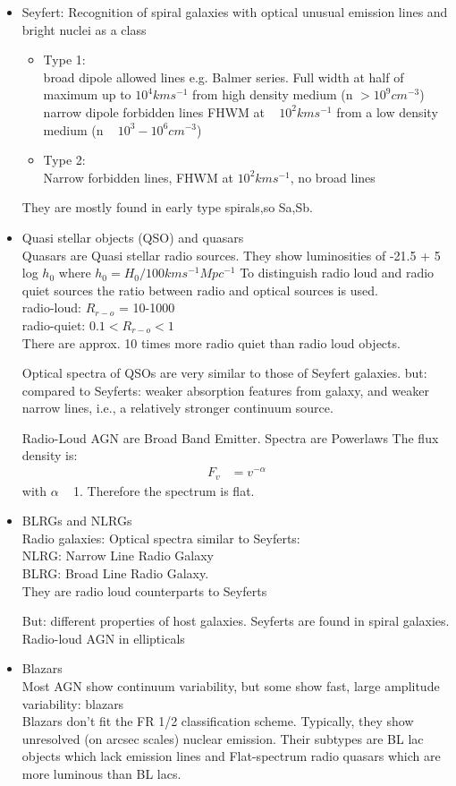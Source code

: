 \documentclass[11pt,a4paper]{article}
\begin{document}
\begin{itemize}
    \item Seyfert: 
         Recognition of spiral galaxies with optical unusual emission
lines and bright nuclei as a class
    \begin{itemize}
        \item Type 1: \\ 
            broad dipole allowed lines e.g. Balmer series. Full width at half of maximum up  to $10^4 kms^{-1}$ from high density medium (n $> 10^9 cm^{-3}$)
            narrow dipole forbidden lines FHWM at ~ $10^2 kms^{-1}$ from a low density medium (n ~ $10^3-10^6cm^{-3}$)
        \item Type 2: \\ 
            Narrow forbidden lines, FHWM at $10^2 kms^{-1}$, no broad lines
    \end{itemize}
    They are mostly found in early type spirals,so Sa,Sb.
\item Quasi stellar objects (QSO) and quasars\\ 
    Quasars are Quasi stellar radio sources. 
    They show luminosities of -21.5 + 5 log $h_0$ where $h_0 = H_0/100 kms^{-1} Mpc^{-1}$
    To distinguish radio loud and radio quiet sources the ratio between radio and optical sources is used.\\
    radio-loud: $R_{r-o}$ = 10-1000 \\
radio-quiet: $0.1 < R_{r-o} < 1$ \\
There are approx. 10 times more radio quiet than radio loud objects.

Optical spectra of QSOs are very similar to those of Seyfert galaxies.
but: compared to Seyferts: weaker absorption features from galaxy, and weaker
narrow lines, i.e., a relatively stronger continuum source.

Radio-Loud AGN are Broad
Band Emitter. Spectra are
Powerlaws
The flux density is:
\begin{align*}
    F_v & = v^{-\alpha} 
\end{align*}
with $\alpha$ ~ 1.
Therefore the spectrum is flat. 
\item BLRGs and NLRGs \\  
    Radio galaxies: Optical spectra similar to
Seyferts: \\
NLRG: Narrow Line Radio Galaxy \\
BLRG: Broad Line Radio Galaxy. \\
They are radio loud counterparts to Seyferts

But: different properties of host galaxies.
Seyferts are found in spiral galaxies. Radio-loud
AGN in ellipticals 
\item Blazars \\
    Most AGN show continuum variability, but
some show fast, large amplitude variability:
blazars \\
Blazars don’t fit the FR 1/2 classification scheme. Typically, they show unresolved (on arcsec scales) nuclear
emission.
Their subtypes are BL lac objects which lack emission lines and Flat-spectrum radio quasars which are more luminous than BL lacs.
\end{itemize} 
\end{document}
